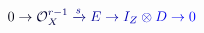\documentclass[12pt]{article}
\begin{document}
\makeatletter
\renewcommand*{\@textcolor}[3]{%
  \protect\leavevmode
  \begingroup
    \color#1{#2}#3%
  \endgroup
}
\makeatother
\begin{displaymath}
\mathcolor[RGB]{0,0,15}{0} \mathcolor[RGB]{0,0,30}{\rightarrow} \mathcal { \mathcolor[RGB]{0,0,45}{O} } _ { \mathcolor[RGB]{0,0,60}{X} } ^ { \mathcolor[RGB]{0,0,75}{r} \mathcolor[RGB]{0,0,90}{-} \mathcolor[RGB]{0,0,105}{1} } \mathcolor[RGB]{0,0,120}{\xrightarrow { \mathcolor[RGB]{0,0,135}{s} } } \mathcolor[RGB]{0,0,150}{E} \mathcolor[RGB]{0,0,165}{\rightarrow} \mathcolor[RGB]{0,0,180}{I} _ { \mathcolor[RGB]{0,0,195}{Z} } \mathcolor[RGB]{0,0,210}{\otimes} \mathcolor[RGB]{0,0,225}{D} \mathcolor[RGB]{0,0,240}{\rightarrow} \mathcolor[RGB]{0,0,255}{0}
\end{displaymath}
\end{document}
